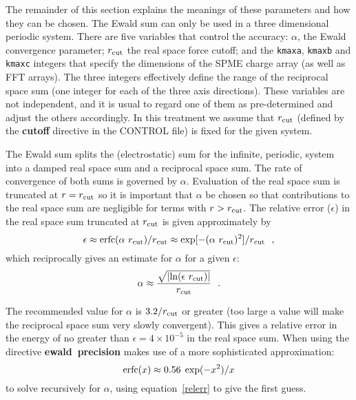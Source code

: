 The remainder of this section explains the meanings of these
parameters and how they can be chosen.  The Ewald
sum can only be used in a three dimensional
periodic system.  There are five variables that control the
accuracy: $\alpha$, the Ewald convergence parameter; $r_{\rm cut}$
the real space force cutoff; and the {\tt kmaxa}, {\tt kmaxb} and
{\tt kmaxc} integers that specify the dimensions of the SPME
charge array (as well as FFT arrays).  The three integers
effectively define the range of the reciprocal space sum
(one integer for each of the three axis directions).  These
variables are not independent, and it is usual to regard one of
them as pre-determined and adjust the others accordingly.  In this
treatment we assume that $r_{\rm cut}$ (defined by the {\bf cutoff}
directive in the CONTROL file) is fixed for the given system.

The Ewald sum splits the (electrostatic) sum for the infinite,
periodic, system into a damped real space sum and a reciprocal
space sum.  The rate of convergence of both sums is governed by
$\alpha$.  Evaluation of the real space sum is truncated at
$r=r_{\rm cut}$ so it is important that $\alpha$ be chosen so that
contributions to the real space sum are negligible for terms with
$r>r_{\rm cut}$.  The relative error ($\epsilon$) in the real
space sum truncated at $r_{\rm cut}$ is given approximately
by
\begin{equation}
\epsilon \approx {\rm erfc}(\alpha~r_{\rm cut})/r_{\rm cut}
\approx \exp[-(\alpha~r_{\rm cut})^{2}]/r_{\rm cut}~~, \label{relerr}
\end{equation}
which reciprocally gives an estimate for $\alpha$ for a given $\epsilon$:
\begin{equation}
\alpha \approx \frac{\sqrt{|{\rm ln}(\epsilon~r_{\rm cut})|}}{r_{\rm cut}}~~.
\end{equation}

The recommended value for $\alpha$ is $3.2/r_{\rm cut}$ or greater
(too large a value will make the reciprocal space sum very slowly
convergent).  This gives a relative error in the energy of no
greater than $\epsilon = 4 \times 10^{-5}$ in the real space sum.
When using the directive {\bf ewald~precision} \D makes use of a
more sophisticated approximation:
\begin{equation}
{\rm erfc}(x) \approx 0.56 \; \exp(-x^{2})/x
\end{equation}
to solve recursively for $\alpha$, using equation~\ref{relerr} to give
the first guess.

